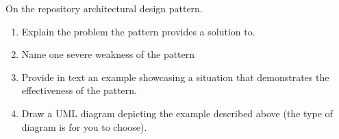 On the repository architectural design pattern.

\begin{enumerate}
    \item {} Explain the problem the pattern provides a solution to.
        \newline\answer\questionNineAnswerA
    \item {} Name one severe weakness of the pattern
        \newline\answer\questionNineAnswerB
    \item {} Provide in text an example showcasing a situation that demonstrates
the effectiveness of the pattern. 
        \newline\answer\questionNineAnswerC
    \item {} Draw a UML diagram depicting the example described above (the
type of diagram is for you to choose). 
        \newline\answer\questionNineAnswerD
\end{enumerate}